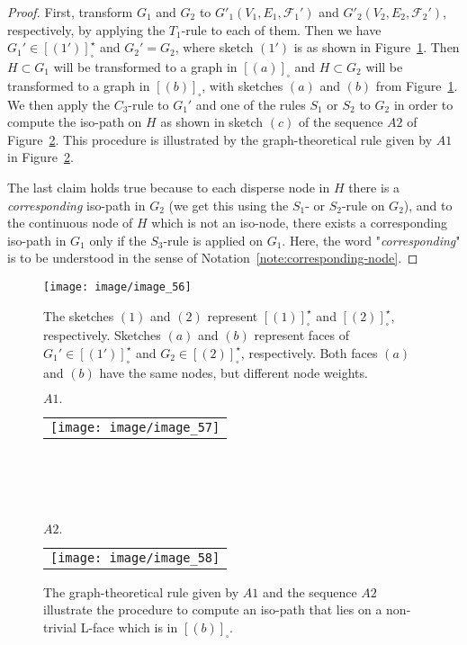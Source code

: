 \documentclass[a4paper,11pt]{article}
\begin{document}
\begin{proof} First, transform $G_1$ and $G_2$ to $G'_1(V_1,E_1,\mathcal{F}_1')$ and
$G'_2(V_2,E_2,\mathcal{F}_2')$, respectively, by applying the $T_1$-rule to each of
them. Then we have $G_1'\in [(1')]_{\square}^{\star}$ and $G_2'=G_2$, where sketch $(1')$ is as
shown in Figure~\ref{image_56}. Then $H\subset G_1$ will be transformed to a graph in
$[(a)]_{\square}$ and $H\subset G_2$ will be transformed to a graph in $[(b)]_{\square}$,
with sketches $(a)$ and $(b)$ from Figure~\ref{image_56}. We then apply the $C_3$-rule
to $G_1'$ and one of the rules $S_1$ or $S_2$ to $G_2$ in order to compute the iso-path on $H$
as shown in sketch $(c)$ of the sequence $A2$ of Figure~\ref{image_57_58}. This procedure is
illustrated by the graph-theoretical rule given by $A1$ in Figure~\ref{image_57_58}.

The last claim holds true because to each disperse node in $H$ there is a {\it corresponding}
iso-path in $G_2$ (we get this using the $S_1$- or $S_2$-rule on $G_2$), and to the continuous
node of $H$ which is not an iso-node, there exists a corresponding iso-path in $G_1$ only if the
$S_3$-rule is applied on $G_1$. Here, the word "{\it corresponding}" is to be understood in the
sense of Notation~\ref{note:corresponding-node}.
\end{proof}
\begin{figure}[!ht]
\texttt{[image: image/image\_56]}
\caption{The sketches $(1)$ and $(2)$ represent $[(1)]_{\square}^{\star}$ and $[(2)]_{\square}^{\star}$,
respectively. Sketches $(a)$ and $(b)$ represent faces of $G_1'\in [(1')]_{\square}^{\star}$ and
$G_2\in [(2)]_{\square}^{\star}$, respectively. Both faces $(a)$ and $(b)$ have the same nodes, but
different node weights.}
\label{image_56}
\end{figure}
\FloatBarrier
\begin{figure}[!ht]
$A1.$
\begin{tabular}[c]{l}
\texttt{[image: image/image\_57]}
\end{tabular}\\ \\
\mbox{}\\ \\
$A2.$
\begin{tabular}[c]{l}
\texttt{[image: image/image\_58]}
\end{tabular}
\caption{The graph-theoretical rule given by $A1$ and the sequence $A2$ illustrate the procedure
to compute an iso-path that lies on a non-trivial L-face which is in $[(b)]_{\square}$.}
\label{image_57_58}
\end{figure}
\end{document}
